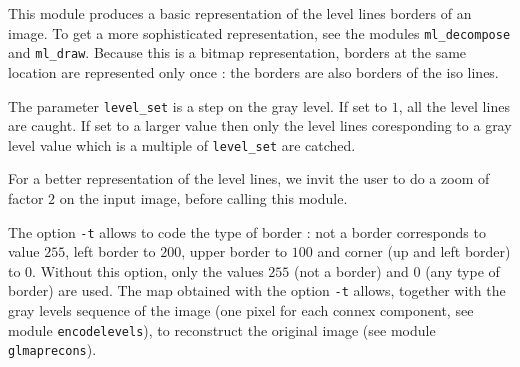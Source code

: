 This module produces a basic representation of the level lines borders of an 
image. To get a more sophisticated representation, see the modules 
\verb+ml_decompose+ and \verb+ml_draw+.
Because this is a bitmap representation, borders at the same location are
represented only once : the borders are also borders of the iso lines.

The parameter \verb+level_set+ is a step on the gray level. If set to $1$, 
all the level lines are caught. If set to a larger value then only the
level lines coresponding to a gray level value which is a multiple of  
\verb+level_set+ are catched.

For a better representation of the level lines, we invit the user to 
do a zoom of factor $2$ on the input image, before calling this module.

The option \verb+-t+ allows to code the type of border : not a border 
corresponds to value $255$, left border to $200$, upper border to $100$ 
and corner (up and left border) to $0$. Without this option, only the
values $255$ (not a border) and $0$ (any type of border) are used.
The map obtained with the option \verb+-t+ allows, together with the
gray levels sequence of the image (one pixel for each connex component,
see module \verb+encodelevels+), to reconstruct the original image
(see module \verb+glmaprecons+).
